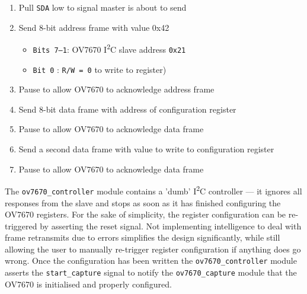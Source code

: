 \begin{enumerate}
    \item Pull \texttt{SDA} low to signal master is about to send
    \item Send 8-bit address frame with value 0x42
        \begin{itemize}
            \item \texttt{Bits 7--1}: OV7670 I\textsuperscript{2}C slave address \texttt{0x21}
            \item \texttt{Bit 0}    : \texttt{R/W = 0} to write to register) 
        \end{itemize}
    \item Pause to allow OV7670 to acknowledge address frame
    \item Send 8-bit data frame with address of configuration register
    \item Pause to allow OV7670 to acknowledge data frame
    \item Send a second data frame with value to write to configuration register
    \item Pause to allow OV7670 to acknowledge data frame
\end{enumerate}

The \texttt{ov7670\_controller} module contains a 'dumb' I\textsuperscript{2}C controller --- it ignores all responses from the slave and stops as soon as it has finished configuring the OV7670 registers. For the sake of simplicity, the register configuration can be re-triggered by asserting the reset signal. Not implementing intelligence to deal with frame retransmits due to errors simplifies the design significantly, while still allowing the user to manually re-trigger register configuration if anything does go wrong. Once the configuration has been written the \texttt{ov7670\_controller} module asserts the \texttt{start\_capture} signal to notify the \texttt{ov7670\_capture} module that the OV7670 is initialised and properly configured.

